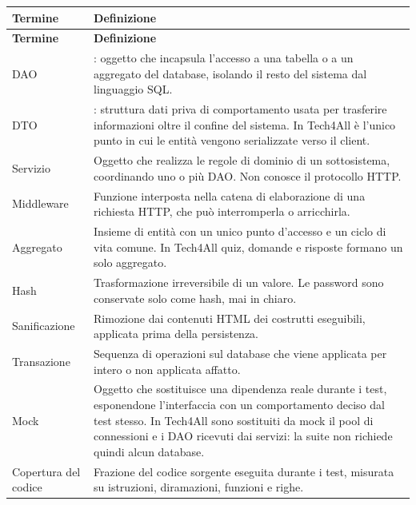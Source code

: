 \begin{longtable}{@{}L{3.2cm} L{11.5cm}@{}}
\toprule
\textbf{Termine} & \textbf{Definizione} \\
\midrule
\endfirsthead
\toprule
\textbf{Termine} & \textbf{Definizione} \\
\midrule
\endhead
\bottomrule
\endlastfoot

DAO &
: oggetto che incapsula l'accesso a una tabella o a
un aggregato del database, isolando il resto del sistema dal linguaggio SQL. \\

DTO &
: struttura dati priva di comportamento usata per
trasferire informazioni oltre il confine del sistema. In Tech4All è l'unico
punto in cui le entità vengono serializzate verso il client. \\

Servizio &
Oggetto che realizza le regole di dominio di un sottosistema, coordinando uno
o più DAO. Non conosce il protocollo HTTP. \\

Middleware &
Funzione interposta nella catena di elaborazione di una richiesta HTTP, che
può interromperla o arricchirla. \\

Aggregato &
Insieme di entità con un unico punto d'accesso e un ciclo di vita comune.
In Tech4All quiz, domande e risposte formano un solo aggregato. \\

Hash &
Trasformazione irreversibile di un valore. Le password sono conservate solo
come hash, mai in chiaro. \\

Sanificazione &
Rimozione dai contenuti HTML dei costrutti eseguibili, applicata prima della
persistenza. \\

Transazione &
Sequenza di operazioni sul database che viene applicata per intero o non
applicata affatto. \\

Mock &
Oggetto che sostituisce una dipendenza reale durante i test, esponendone
l'interfaccia con un comportamento deciso dal test stesso. In Tech4All sono
sostituiti da mock il pool di connessioni e i DAO ricevuti dai servizi: la
suite non richiede quindi alcun database. \\

Copertura del codice &
Frazione del codice sorgente eseguita durante i test, misurata su istruzioni,
diramazioni, funzioni e righe. \\

\end{longtable}

